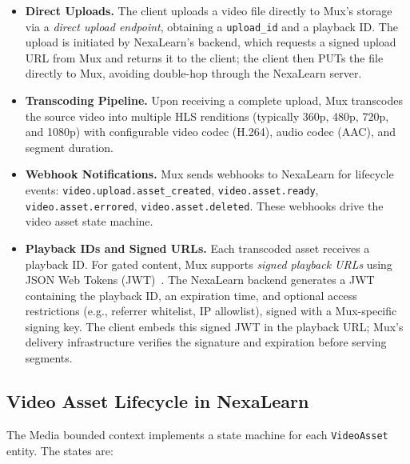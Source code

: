 \begin{itemize}
  \item \textbf{Direct Uploads.} The client uploads a video file directly to Mux's storage via a \textit{direct upload endpoint}, obtaining a \texttt{upload\_id} and a playback ID. The upload is initiated by NexaLearn's backend, which requests a signed upload URL from Mux and returns it to the client; the client then PUTs the file directly to Mux, avoiding double-hop through the NexaLearn server.
  \item \textbf{Transcoding Pipeline.} Upon receiving a complete upload, Mux transcodes the source video into multiple HLS renditions (typically 360p, 480p, 720p, and 1080p) with configurable video codec (H.264), audio codec (AAC), and segment duration.
  \item \textbf{Webhook Notifications.} Mux sends webhooks to NexaLearn for lifecycle events: \texttt{video.upload.asset\_created}, \texttt{video.asset.ready}, \texttt{video.asset.errored}, \texttt{video.asset.deleted}. These webhooks drive the video asset state machine.
  \item \textbf{Playback IDs and Signed URLs.} Each transcoded asset receives a playback ID. For gated content, Mux supports \textit{signed playback URLs} using JSON Web Tokens (JWT)~\cite{jones2015jwt}. The NexaLearn backend generates a JWT containing the playback ID, an expiration time, and optional access restrictions (e.g., referrer whitelist, IP allowlist), signed with a Mux-specific signing key. The client embeds this signed JWT in the playback URL; Mux's delivery infrastructure verifies the signature and expiration before serving segments.
\end{itemize}

\subsection{Video Asset Lifecycle in NexaLearn}

The Media bounded context implements a state machine for each \texttt{VideoAsset} entity. The states are:

